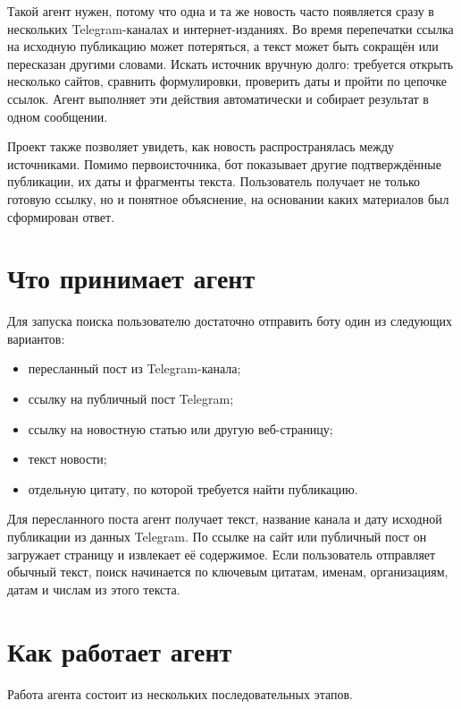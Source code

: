 \documentclass[11pt,a4paper]{article}
\begin{document}
Такой агент нужен, потому что одна и та же новость часто появляется сразу в нескольких Telegram-каналах и интернет-изданиях. Во время перепечатки ссылка на исходную публикацию может потеряться, а текст может быть сокращён или пересказан другими словами. Искать источник вручную долго: требуется открыть несколько сайтов, сравнить формулировки, проверить даты и пройти по цепочке ссылок. Агент выполняет эти действия автоматически и собирает результат в одном сообщении.

Проект также позволяет увидеть, как новость распространялась между источниками. Помимо первоисточника, бот показывает другие подтверждённые публикации, их даты и фрагменты текста. Пользователь получает не только готовую ссылку, но и понятное объяснение, на основании каких материалов был сформирован ответ.

\section*{Что принимает агент}

Для запуска поиска пользователю достаточно отправить боту один из следующих вариантов:

\begin{itemize}[leftmargin=1.8em]
    \item пересланный пост из Telegram-канала;
    \item ссылку на публичный пост Telegram;
    \item ссылку на новостную статью или другую веб-страницу;
    \item текст новости;
    \item отдельную цитату, по которой требуется найти публикацию.
\end{itemize}

Для пересланного поста агент получает текст, название канала и дату исходной публикации из данных Telegram. По ссылке на сайт или публичный пост он загружает страницу и извлекает её содержимое. Если пользователь отправляет обычный текст, поиск начинается по ключевым цитатам, именам, организациям, датам и числам из этого текста.

\section*{Как работает агент}

Работа агента состоит из нескольких последовательных этапов.
\end{document}
